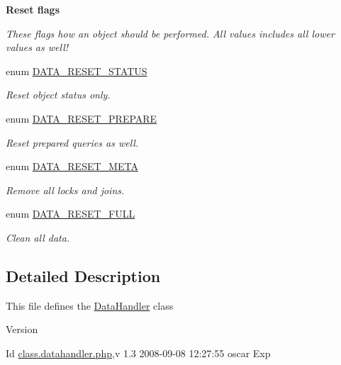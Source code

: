 \begin{Indent}{\bf Reset flags}\par
{\em \label{_amgrp143448a659afeaa8616ca6e3acdb751b}
 These flags how an object should be performed. All values includes all lower values as well! }\begin{DoxyCompactItemize}
\item 
enum \hyperlink{class_8datahandler_8php_a9266811d651cb3ff8c5fdf00111e677b}{DATA\_\-RESET\_\-STATUS} 
\begin{DoxyCompactList}\small\item\em Reset object status only. \item\end{DoxyCompactList}\item 
enum \hyperlink{class_8datahandler_8php_a19a99423705b41e563424ae76d7fe184}{DATA\_\-RESET\_\-PREPARE} 
\begin{DoxyCompactList}\small\item\em Reset prepared queries as well. \item\end{DoxyCompactList}\item 
enum \hyperlink{class_8datahandler_8php_a3ce9f928f9ba75096925bd4157246bbb}{DATA\_\-RESET\_\-META} 
\begin{DoxyCompactList}\small\item\em Remove all locks and joins. \item\end{DoxyCompactList}\item 
enum \hyperlink{class_8datahandler_8php_a2a28429433990da242faa223d5a49f0a}{DATA\_\-RESET\_\-FULL} 
\begin{DoxyCompactList}\small\item\em Clean all data. \item\end{DoxyCompactList}\end{DoxyCompactItemize}
\end{Indent}


\subsection{Detailed Description}
This file defines the \hyperlink{classDataHandler}{DataHandler} class \begin{DoxyVersion}{Version}

\end{DoxyVersion}
\begin{DoxyParagraph}{Id}
\hyperlink{class_8datahandler_8php}{class.datahandler.php},v 1.3 2008-\/09-\/08 12:27:55 oscar Exp 
\end{DoxyParagraph}


